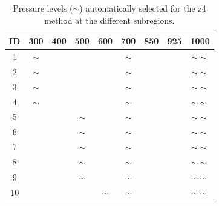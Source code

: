 \documentclass[5p]{elsarticle}
\begin{document}
\begin{table}[htbp]
	\caption{Pressure levels ($\sim$) automatically selected for the z4 method at the different subregions.}
	\footnotesize
	\begin{center}
		\begin{tabular}{ccccccccc}
			\hline ID & 300 & 400 & 500 & 600 & 700 & 850 & 925 & 1000 \\ 
			\hline 
			1  & $\sim$ &   &   &   & $\sim$ &   &   & $\sim \sim$ \\
			2  & $\sim$ &   &   &   & $\sim$ &   &   & $\sim \sim$ \\
			3  & $\sim$ &   &   &   & $\sim$ &   &   & $\sim \sim$ \\
			4  & $\sim$ &   &   &   & $\sim$ &   &   & $\sim \sim$ \\
			5  &   &   & $\sim$ &   & $\sim$ &   &   & $\sim \sim$ \\
			6  &   &   & $\sim$ &   & $\sim$ &   &   & $\sim \sim$ \\
			7  &   &   & $\sim$ &   & $\sim$ &   &   & $\sim \sim$ \\
			8  &   &   & $\sim$ &   & $\sim$ &   &   & $\sim \sim$ \\
			9  &   &   & $\sim$ &   & $\sim$ &   &   & $\sim \sim$ \\
			10 &   &   &   & $\sim$ & $\sim$ &   &   & $\sim \sim$ \\
			\hline 
		\end{tabular} 
	\end{center}
	\label{table:levels_GA_z4}
\end{table}
\end{document}

